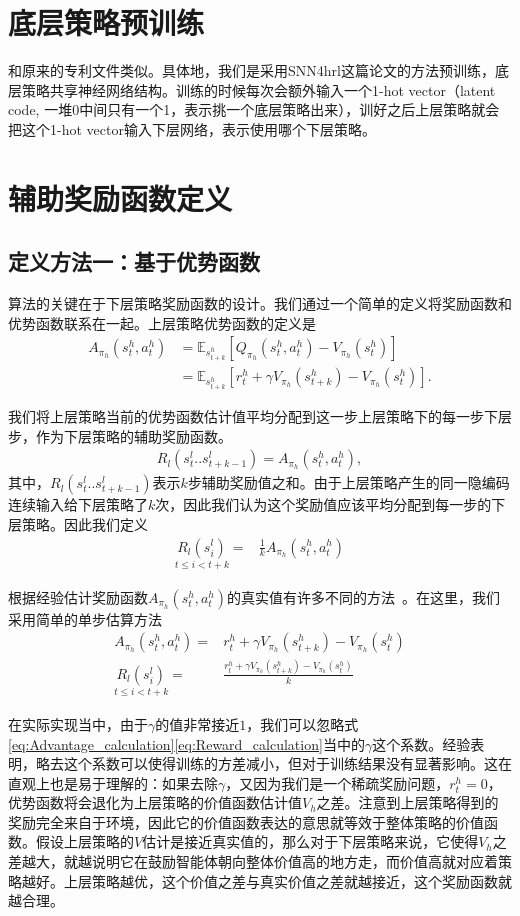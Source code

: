 \section{底层策略预训练}
和原来的专利文件类似。具体地，我们是采用SNN4hrl这篇论文的方法预训练，底层策略共享神经网络结构。训练的时候每次会额外输入一个1-hot vector（latent code, 一堆0中间只有一个1，表示挑一个底层策略出来），训好之后上层策略就会把这个1-hot vector输入下层网络，表示使用哪个下层策略。

\section{辅助奖励函数定义}
\subsection{定义方法一：基于优势函数}
算法的关键在于下层策略奖励函数的设计。我们通过一个简单的定义将奖励函数和优势函数联系在一起。上层策略优势函数的定义是
	\begin{align}
	A_{\pi_h}(s_t^h, a_t^h)&=\mathbb{E}_{s_{t+k}^h}[Q_{\pi_h}(s_t^h, a_t^h)-V_{\pi_h}(s_t^h)]\\
	&= \mathbb{E}_{s_{t+k}^h}[r_t^h+\gamma V_{\pi_h}(s_{t+k}^h)-V_{\pi_h}(s_t^h)].
	\end{align}
	
我们将上层策略当前的优势函数估计值平均分配到这一步上层策略下的每一步下层步，作为下层策略的辅助奖励函数。
	\begin{align}
	R_l(s_t^l..s_{t+k-1}^l)=A_{\pi_h}(s_t^h,a_t^h),
	\end{align}
其中，$R_l(s_t^l..s_{t+k-1}^l)$表示$k$步辅助奖励值之和。由于上层策略产生的同一隐编码连续输入给下层策略了$k$次，因此我们认为这个奖励值应该平均分配到每一步的下层策略。因此我们定义
	\begin{align}
	\underset{t\leq  i < t+k}{R_l(s_i^l)}=&\frac{1}{k} A_{\pi_h}(s_t^h,a_t^h)
	\end{align}

根据经验估计奖励函数$A_{\pi_h}(s_t^h, a_t^h)$的真实值有许多不同的方法~\cite{GAE}。在这里，我们采用简单的单步估算方法
	\begin{align}
	A_{\pi_h}(s_t^h, a_t^h)=&r_t^h+\gamma V_{\pi_h}(s_{t+k}^h)-V_{\pi_h}(s_t^h)
	\label{eq:Advantage_calculation}
	\\
	\underset{t\leq  i < t+k}{R_l(s_i^l)}=&\frac{r_t^h+\gamma V_{\pi_h}(s_{t+k}^h)-V_{\pi_h}(s_t^h)}{k}
	\label{eq:Reward_calculation}
	\end{align}

在实际实现当中，由于$\gamma$的值非常接近$1$，我们可以忽略式\eqref{eq:Advantage_calculation}\eqref{eq:Reward_calculation}当中的$\gamma$这个系数。经验表明，略去这个系数可以使得训练的方差减小，但对于训练结果没有显著影响。这在直观上也是易于理解的：如果去除$\gamma$，又因为我们是一个稀疏奖励问题，$r_t^h = 0$，优势函数将会退化为上层策略的价值函数估计值$V_h$之差。注意到上层策略得到的奖励完全来自于环境，因此它的价值函数表达的意思就等效于整体策略的价值函数。假设上层策略的$V$估计是接近真实值的，那么对于下层策略来说，它使得$V_h$之差越大，就越说明它在鼓励智能体朝向整体价值高的地方走，而价值高就对应着策略越好。上层策略越优，这个价值之差与真实价值之差就越接近，这个奖励函数就越合理。

